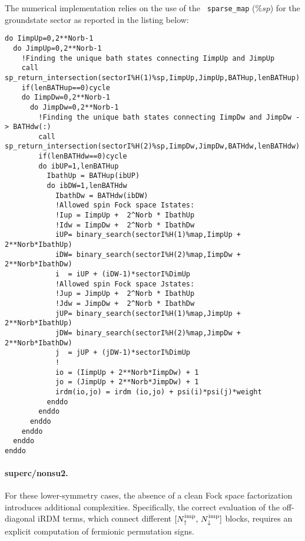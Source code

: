 \documentclass[edipack_sp.tex]{subfiles}
\begin{document}
The numerical implementation relies on the use of the {\tt
  sparse\_map} ($\%sp$) for the groundstate sector as reported in the listing below:  
\begin{lstlisting}[style=fstyle,numbers=none,basicstyle={\scriptsize\ttfamily}]
do IimpUp=0,2**Norb-1
  do JimpUp=0,2**Norb-1
    !Finding the unique bath states connecting IimpUp and JimpUp
    call sp_return_intersection(sectorI%H(1)%sp,IimpUp,JimpUp,BATHup,lenBATHup)
    if(lenBATHup==0)cycle
    do IimpDw=0,2**Norb-1
      do JimpDw=0,2**Norb-1
        !Finding the unique bath states connecting IimpDw and JimpDw -> BATHdw(:)
        call sp_return_intersection(sectorI%H(2)%sp,IimpDw,JimpDw,BATHdw,lenBATHdw)
        if(lenBATHdw==0)cycle
        do ibUP=1,lenBATHup
          IbathUp = BATHup(ibUP)
          do ibDW=1,lenBATHdw
            IbathDw = BATHdw(ibDW)
            !Allowed spin Fock space Istates:
            !Iup = IimpUp +  2^Norb * IbathUp
            !Idw = IimpDw +  2^Norb * IbathDw
            iUP= binary_search(sectorI%H(1)%map,IimpUp + 2**Norb*IbathUp)
            iDW= binary_search(sectorI%H(2)%map,IimpDw + 2**Norb*IbathDw)
            i  = iUP + (iDW-1)*sectorI%DimUp
            !Allowed spin Fock space Jstates:
            !Jup = JimpUp +  2^Norb * IbathUp
            !Jdw = JimpDw +  2^Norb * IbathDw
            jUP= binary_search(sectorI%H(1)%map,JimpUp + 2**Norb*IbathUp)
            jDW= binary_search(sectorI%H(2)%map,JimpDw + 2**Norb*IbathDw)
            j  = jUP + (jDW-1)*sectorI%DimUp
            ! 
            io = (IimpUp + 2**Norb*IimpDw) + 1
            jo = (JimpUp + 2**Norb*JimpDw) + 1
            irdm(io,jo) = irdm (io,jo) + psi(i)*psi(j)*weight
          enddo
        enddo
      enddo
    enddo
  enddo
enddo
\end{lstlisting}



\paragraph{{\bf superc/nonsu2}.}
For these lower-symmetry cases, the absence of a clean Fock space 
factorization introduces additional complexities. Specifically, the 
correct evaluation of the off-diagonal iRDM terms, which connect 
different $[N^\mathrm{imp}_\uparrow,\,N^\mathrm{imp}_\downarrow]$ blocks, 
requires an explicit computation of fermionic permutation signs.
\end{document}

